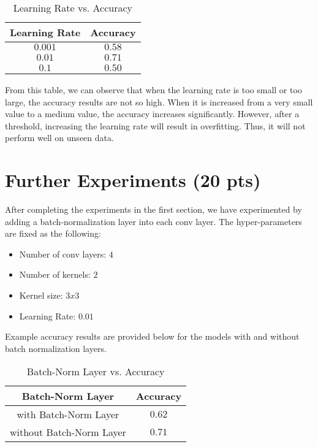 \documentclass[12pt]{article}
\begin{document}
\begin{table}[H]
\begin{center}
\caption{Learning Rate vs. Accuracy}
\begin{tabular}{|c|c|}
\hline
 Learning Rate & Accuracy \\
\hline
$0.001$ & $0.58$ \\
\hline
$0.01$ & $0.71$ \\
\hline
$0.1$ & $0.50$ \\
\hline
\end{tabular}
\end{center}
\end{table}


From this table, we can observe that when the learning rate is too small or too large, the accuracy results are not so high. When it is increased from a very small value to a medium value, the accuracy increases significantly. However, after a threshold, increasing the learning rate will result in overfitting. Thus, it will not perform well on unseen data.

\section{Further Experiments (20 pts)}
After completing the experiments in the first section, we have experimented by adding a batch-normalization layer into each conv layer. The hyper-parameters are fixed as the following:

\begin{itemize}
	\item Number of conv layers: $4$
	\item Number of kernels: $2$
	\item Kernel size: $3x3$
	\item Learning Rate: $0.01$
\end{itemize}

Example accuracy results are provided below for the models with and without batch normalization layers.

\begin{table}[H]
\begin{center}
\caption{Batch-Norm Layer vs. Accuracy}
\begin{tabular}{|c|c|}
\hline
 Batch-Norm Layer & Accuracy \\
\hline
with Batch-Norm Layer & $0.62$ \\
\hline
without Batch-Norm Layer & $0.71$ \\
\hline
\end{tabular}
\end{center}
\end{table} 
\end{document}
